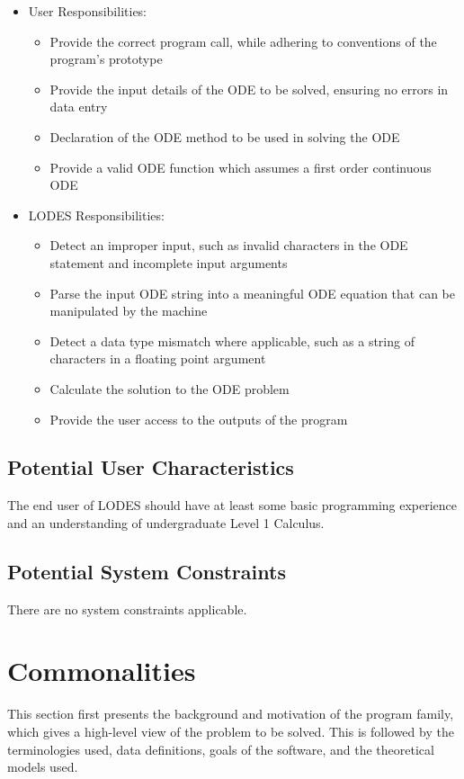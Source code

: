 \documentclass[12pt]{article}
\newcommand{\famname}{LODES} %
\begin{document}
\begin{itemize}
\item User Responsibilities:
\begin{itemize}
\item Provide the correct program call, while adhering to conventions of the program's prototype
\item Provide the input details of the ODE to be solved, ensuring no errors in data entry
\item Declaration of the ODE method to be used in solving the ODE
\item Provide a valid ODE function which assumes a first order continuous ODE
\end{itemize}
\item \famname{} Responsibilities:
\begin{itemize}
\item Detect an improper input, such as invalid characters in the ODE statement and incomplete input arguments
\item Parse the input ODE string into a meaningful ODE equation that can be manipulated by the machine
\item Detect a data type mismatch where applicable, such as a string of characters in a floating point argument
\item Calculate the solution to the ODE problem
\item Provide the user access to the outputs of the program
\end{itemize}
\end{itemize}

\subsection{Potential User Characteristics}

The end user of \famname{} should have at least some basic programming experience and
an understanding of undergraduate Level 1 Calculus.

\subsection{Potential System Constraints}

There are no system constraints applicable.

\section{Commonalities}
This section first presents the background and motivation of the program family, which gives a
high-level view of the problem to be solved.  This is followed by the terminologies used, data
definitions, goals of the software, and the theoretical models used. 
\end{document}
